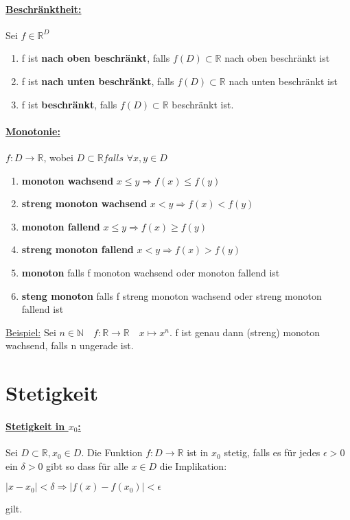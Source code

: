 \documentclass[8pt]{extreport}
\begin{document}
\paragraph{\underline{Beschränktheit:}} Sei $f \in \mathbb{R}^D$
\begin{enumerate}
\item f ist \textbf{nach oben beschränkt}, falls $f(D) \subset \mathbb{R}$ nach oben beschränkt ist
\item f ist \textbf{nach unten beschränkt}, falls $f(D) \subset \mathbb{R}$ nach unten beschränkt ist
\item f ist \textbf{beschränkt}, falls $f(D) \subset \mathbb{R}$ beschränkt ist.
\end{enumerate}
\paragraph{\underline{Monotonie:}} $f: D \rightarrow \mathbb{R}$, wobei $D \subset \mathbb{R} falls $ $\forall x,y \in D$
\begin{enumerate}
\item \textbf{monoton wachsend} $ x\leq y \Rightarrow f(x) \leq f(y)$
\item \textbf{streng monoton wachsend} $ x<y \Rightarrow f(x) < f(y)$
\item \textbf{monoton fallend} $ x \leq y \Rightarrow f(x)  \geq f(y)$
\item \textbf{streng monoton fallend} $ x<y \Rightarrow f(x) > f(y)$
\item \textbf{monoton} falls f monoton wachsend oder monoton fallend ist
\item \textbf{steng monoton} falls f streng monoton wachsend oder streng monoton fallend ist
\end{enumerate}
\underline{Beispiel:} Sei $n \in \mathbb{N} \quad f: \mathbb{R} \rightarrow \mathbb{R} \quad x \mapsto x^n$. f ist genau dann (streng) monoton wachsend, falls n ungerade ist.
\section{Stetigkeit}
\paragraph{\underline{Stetigkeit in $x_0$:}} Sei $D \subset \mathbb{R}, x_0 \in D$. Die Funktion $f: D \rightarrow \mathbb{R}$ ist in $x_0$ stetig, falls es für jedes $\epsilon > 0$ ein $\delta > 0$ gibt so dass für alle $x \in D$ die Implikation:
\begin{center}
$|x-x_0| < \delta \Rightarrow |f(x) -f(x_0)| < \epsilon$
\end{center}
gilt.
\end{document}
